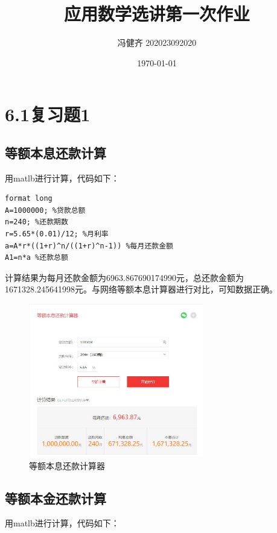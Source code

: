 \documentclass{ctexart}
\title{\vspace{+4cm}\textbf{应用数学选讲第一次作业}}
\author{冯健齐 202023092020}
\date{\today}
\begin{document}
\maketitle
\newpage
{}
\setcounter{page}{0}
\tableofcontents
\newpage
\setcounter{page}{1}

\section{6.1复习题1}
\subsection{等额本息还款计算}
\setlength{\parindent}{2em}用matlb进行计算，代码如下：


\begin{lstlisting}
format long
A=1000000; %贷款总额
n=240; %还款期数
r=5.65*(0.01)/12; %月利率
a=A*r*((1+r)^n/((1+r)^n-1)) %每月还款金额
A1=n*a %还款总额
\end{lstlisting}



\setlength{\parindent}{2em}计算结果为每月还款金额为6963.867690174990元，总还款金额为1671328.245641998元。与网络等额本息计算器进行对比，可知数据正确。

\begin{figure}[h!]
\centering
\includegraphics[width=0.68\textwidth]{等额本息.JPG}
\caption{等额本息还款计算器}
\end{figure}



\subsection{等额本金还款计算}
\setlength{\parindent}{2em}用matlb进行计算，代码如下：
\end{document}

